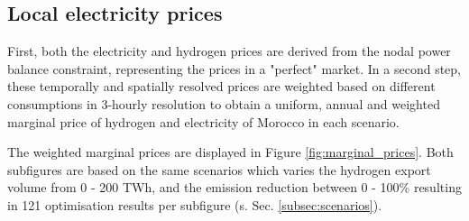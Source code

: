 


\subsection{Local electricity prices}
\label{subsec:results_el_prices}

First, both the electricity and hydrogen prices are derived from the nodal power balance constraint, representing the prices in a "perfect" market. %
In a second step, these temporally and spatially resolved prices are weighted based on different consumptions in 3-hourly resolution to obtain a uniform, annual and weighted marginal price of hydrogen and electricity of Morocco in each scenario. 

The weighted marginal prices are displayed in Figure \ref{fig:marginal_prices}. Both subfigures are based on the same scenarios which varies the hydrogen export volume from 0 - 200 TWh, and the emission reduction between 0 - 100\% resulting in 121 optimisation results per subfigure (s. Sec. \ref{subsec:scenarios}).

